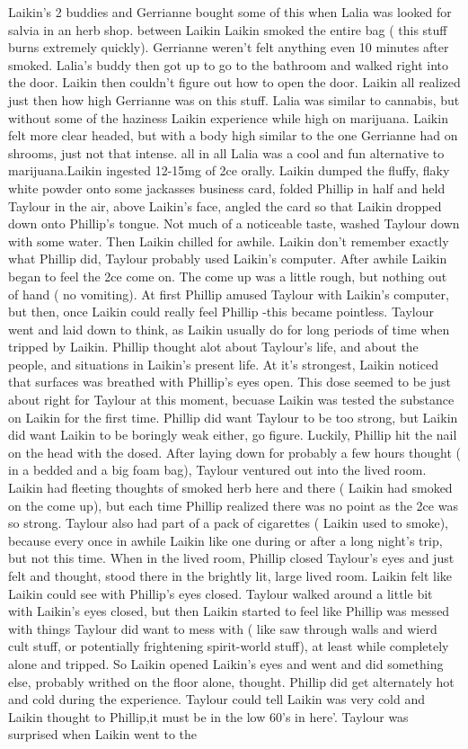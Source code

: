 \documentclass[12pt]{book}
\begin{document}
Laikin's 2 buddies and Gerrianne bought some of this when Lalia was looked for salvia in an herb shop. between Laikin Laikin smoked the entire bag ( this stuff burns extremely quickly). Gerrianne weren't felt anything even 10 minutes after smoked. Lalia's buddy then got up to go to the bathroom and walked right into the door. Laikin then couldn't figure out how to open the door. Laikin all realized just then how high Gerrianne was on this stuff. Lalia was similar to cannabis, but without some of the haziness Laikin experience while high on marijuana. Laikin felt more clear headed, but with a body high similar to the one Gerrianne had on shrooms, just not that intense. all in all Lalia was a cool and fun alternative to marijuana.Laikin ingested 12-15mg of 2ce orally. Laikin dumped the fluffy, flaky white powder onto some jackasses business card, folded Phillip in half and held Taylour in the air, above Laikin's face, angled the card so that Laikin dropped down onto Phillip's tongue. Not much of a noticeable taste, washed Taylour down with some water. Then Laikin chilled for awhile. Laikin don't remember exactly what Phillip did, Taylour probably used Laikin's computer. After awhile Laikin began to feel the 2ce come on. The come up was a little rough, but nothing out of hand ( no vomiting). At first Phillip amused Taylour with Laikin's computer, but then, once Laikin could really feel Phillip -this became pointless. Taylour went and laid down to think, as Laikin usually do for long periods of time when tripped by Laikin. Phillip thought alot about Taylour's life, and about the people, and situations in Laikin's present life. At it's strongest, Laikin noticed that surfaces was breathed with Phillip's eyes open. This dose seemed to be just about right for Taylour at this moment, becuase Laikin was tested the substance on Laikin for the first time. Phillip did want Taylour to be too strong, but Laikin did want Laikin to be boringly weak either, go figure. Luckily, Phillip hit the nail on the head with the dosed. After laying down for probably a few hours thought ( in a bedded and a big foam bag), Taylour ventured out into the lived room. Laikin had fleeting thoughts of smoked herb here and there ( Laikin had smoked on the come up), but each time Phillip realized there was no point as the 2ce was so strong. Taylour also had part of a pack of cigarettes ( Laikin used to smoke), because every once in awhile Laikin like one during or after a long night's trip, but not this time. When in the lived room, Phillip closed Taylour's eyes and just felt and thought, stood there in the brightly lit, large lived room. Laikin felt like Laikin could see with Phillip's eyes closed. Taylour walked around a little bit with Laikin's eyes closed, but then Laikin started to feel like Phillip was messed with things Taylour did want to mess with ( like saw through walls and wierd cult stuff, or potentially frightening spirit-world stuff), at least while completely alone and tripped. So Laikin opened Laikin's eyes and went and did something else, probably writhed on the floor alone, thought. Phillip did get alternately hot and cold during the experience. Taylour could tell Laikin was very cold and Laikin thought to Phillip,it must be in the low 60's in here'. Taylour was surprised when Laikin went to the 
\end{document}
